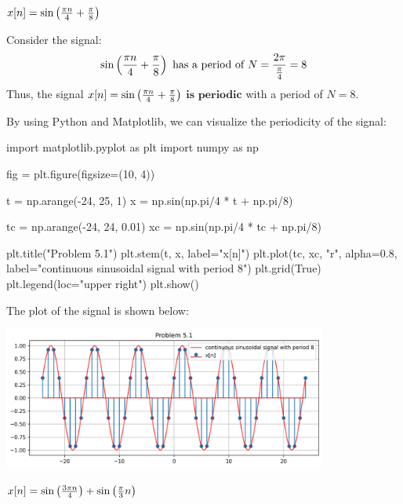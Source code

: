 \documentclass[a4paper, 10pt]{article}
\begin{document}
\begin{subproblems}
    \item \( x[n] = \sin \left( \frac{\pi n}{4} + \frac{\pi}{8}\right) \)
\end{subproblems}

\begin{solution}
Consider the signal:
\[
\sin \left( \frac{\pi n}{4} + \frac{\pi}{8}\right) \text{ has a period of } N = \frac{2\pi}{\frac{\pi}{4}} = 8
\]
Thus, the signal \( x[n] = \sin \left( \frac{\pi n}{4} + \frac{\pi}{8}\right) \) \( \boxed{\textbf{is periodic}} \) with a period of \( \boxed{N = 8} \).

\vspace{5mm}

By using Python and Matplotlib, we can visualize the periodicity of the signal:
\begin{codingbox}
import matplotlib.pyplot as plt
import numpy as np

fig = plt.figure(figsize=(10, 4))

t = np.arange(-24, 25, 1)
x = np.sin(np.pi/4 * t + np.pi/8)

tc = np.arange(-24, 24, 0.01)
xc = np.sin(np.pi/4 * tc + np.pi/8)

plt.title("Problem 5.1")
plt.stem(t, x, label="x[n]")
plt.plot(tc, xc, "r", alpha=0.8, label="continuous sinusoidal signal with period 8")
plt.grid(True)
plt.legend(loc="upper right")
plt.show()
\end{codingbox}

The plot of the signal is shown below:
\begin{center}
    \includegraphics[width=0.8\textwidth]{images/problem_5_1.png}
\end{center}
\end{solution}

\newpage

\begin{subproblems}[start=2]
    \item \( x[n] = \sin \left( \frac{3\pi n}{4} \right) + \sin\left( \frac{\pi}{3}n \right) \)
\end{subproblems}
\end{document}
